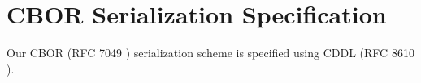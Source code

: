 \section{CBOR Serialization Specification}
\label{sec:cddl}

Our CBOR (RFC 7049 \cite{rfcCBOR})
serialization scheme is specified using
CDDL (RFC 8610 \cite{rfcCDDL}).


